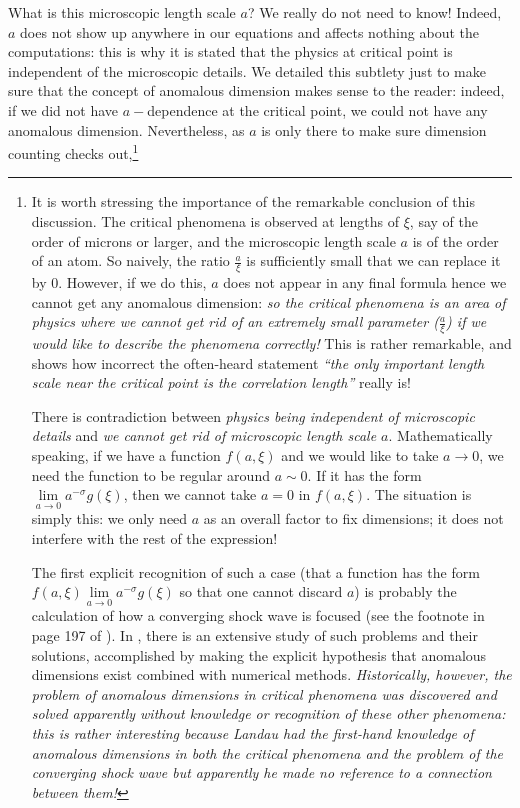 \documentclass[12pt]{article}
\numberwithin{equation}{section}
\begin{document}
What is this microscopic length scale $a$? We really do not need to know! Indeed, $a$ does not show up anywhere in our equations and affects nothing about the computations: this is why it is stated that the physics at critical point is independent of the microscopic details. We detailed this subtlety just to make sure that the concept of anomalous dimension makes sense to the reader: indeed, if we did not have $a-$dependence at the critical point, we could not have any anomalous dimension. Nevertheless, as $a$ is only there to make sure dimension counting checks out,\footnote{
It is worth stressing the importance of the remarkable conclusion of this discussion. The critical phenomena is observed at lengths of $\xi$, say of the order of microns or larger, and the microscopic length scale $a$ is of the order of an atom. So naively, the ratio $\frac{a}{\xi}$ is sufficiently small that we can replace it by $0$. However, if we do this, $a$ does not appear in any final formula hence we cannot get any anomalous dimension: \emph{so the critical phenomena is an area of physics where we cannot get rid of an extremely small parameter ($\frac{a}{\xi}$) if we would like to describe the phenomena correctly!} This is rather remarkable, and shows how incorrect the often-heard statement \emph{``the only important length scale near the critical point is the correlation length''} really is!

There is contradiction between \emph{physics being independent of microscopic details} and \emph{we cannot get rid of microscopic length scale $a$}. Mathematically speaking, if we have a function $f\left(a,\xi\right)$ and we would like to take $a\rightarrow 0$, we need the function to be regular around $a\sim 0$. If it has the form $\lim\limits_{a\rightarrow0}a^{-\sigma}g(\xi)$, then we cannot take $a=0$ in $f(a,\xi)$. The situation is simply this: we only need $a$ as an overall factor to fix dimensions; it does not interfere with the rest of the expression!

The first explicit recognition of such a case (that a function has the form $f(a,\xi)\lim\limits_{a\rightarrow0}a^{-\sigma}g(\xi)$ so that one cannot discard $a$) is probably the calculation of how a converging shock wave is focused (see the footnote in page 197 of \cite{Goldenfeld:1992qy}). In \cite{barenblatt1996scaling}, there is an extensive study of such problems and their solutions, accomplished by making the explicit hypothesis that anomalous dimensions exist combined with numerical methods. \emph{Historically, however, the problem of anomalous dimensions in critical phenomena was discovered and solved apparently without knowledge or recognition of these other phenomena: this is rather interesting because Landau had the first-hand knowledge of anomalous dimensions in both the critical phenomena and the problem of the converging shock wave but apparently he made no reference to a connection between them!}

}
\end{document}
